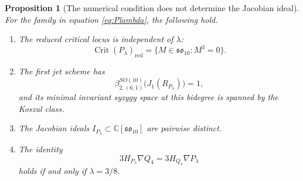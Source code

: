 \documentclass[10pt,reqno]{amsart}
\numberwithin{equation}{section}
\theoremstyle{plain}
\newtheorem{proposition}[theorem]{Proposition}
\theoremstyle{definition}
\DeclareMathOperator{\Crit}{Crit}
\newcommand{\red}{\mathrm{red}}
\begin{document}
\begin{proposition}[The numerical condition does not determine the Jacobian ideal]\label{prop:quartic-nonuniqueness}
For the family in equation \eqref{eq:Plambda}, the following hold.
\begin{enumerate}[label=(\roman*)]
	\item The reduced critical locus is independent of $\lambda$:
	\begin{equation*}
		\Crit(P_\lambda)_\red=\{M\in\mathfrak{so}_{10}:M^3=0\}.
	\end{equation*}
	\item The first jet scheme has
	\begin{equation*}
		\beta^{SO(10)}_{2,(6,1)}\big(J_1(R_{P_\lambda})\big)=1,
	\end{equation*}
	and its minimal invariant syzygy space at this bidegree is spanned by the Koszul class.
	\item The Jacobian ideals $I_{P_\lambda}\subset\mathbb{C}[\mathfrak{so}_{10}]$ are pairwise distinct.
	\item The identity
	\begin{equation*}
		3H_{P_\lambda}\nabla Q_4=3H_{Q_4}\nabla P_\lambda
	\end{equation*}
	holds if and only if $\lambda=3/8$.
\end{enumerate}
\end{proposition}
\end{document}
